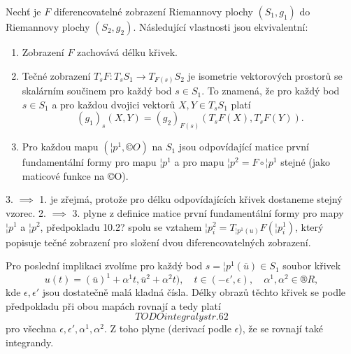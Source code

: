 \documentclass[12pt]{article}                   %
\begin{document}
        \begin{lemma}[O isometrii]
            Nechť je $F$ diferencovatelné zobrazení Riemannovy plochy $(S_1, g_1)$ do Riemannovy plochy $(S_2, g_2)$. Následující vlastnosti jsou ekvivalentní:

            \begin{enumerate}
                \item Zobrazení $F$ zachovává délku křivek.
                \item Tečné zobrazení $T_sF: T_sS_1 \rightarrow T_{F(s)}S_2$ je isometrie vektorových prostorů se skalárním součinem pro každý bod $s \in S_1$. To znamená, že pro každý bod $s \in S_1$ a pro každou dvojici vektorů $X, Y \in T_sS_1$ platí
                        $$ (g_1)_s(X, Y) = (g_2)_{F(s)}(T_sF(X), T_sF(Y)). $$
                \item Pro každou mapu $(¦p^1, ©O)$ na $S_1$ jsou odpovídající matice první fundamentální formy pro mapu $¦p^1$ a pro mapu $¦p^2 = F \circ ¦p^1$ stejné (jako maticové funkce na ©O).
            \end{enumerate}
            
            \begin{dukazin}
                3. $\implies$ 1. je zřejmá, protože pro délku odpovídajících křivek dostaneme stejný vzorec. 2. $\implies$ 3. plyne z definice matice první fundamentální formy pro mapy $¦p^1$ a $¦p^2$, předpokladu 10.2? spolu se vztahem $¦p_i^2 = T_{¦p^1(u)}F(¦p_i^1)$, který popisuje tečné zobrazení pro složení dvou diferencovatelných zobrazení.

                Pro poslední implikaci zvolíme pro každý bod $s = ¦p^1(\overline{u}) \in S_1$ soubor křivek
                $$ u(t) = (\overline{u})^1 + \alpha^1t, \overline{u}^2 + \alpha^2t), \quad t \in (-\epsilon', \epsilon), \quad \alpha^1, \alpha^2 \in ®R, $$
                kde $\epsilon, \epsilon'$ jsou dostatečně malá kladná čísla. Délky obrazů těchto křivek se podle předpokladu při obou mapách rovnají a tedy platí
                $$ TODO integraly str. 62 $$
                pro všechna $\epsilon, \epsilon', \alpha^1, \alpha^2$. Z toho plyne (derivací podle $\epsilon$), že se rovnají také integrandy.
            \end{dukazin}
        \end{lemma}
\end{document}
